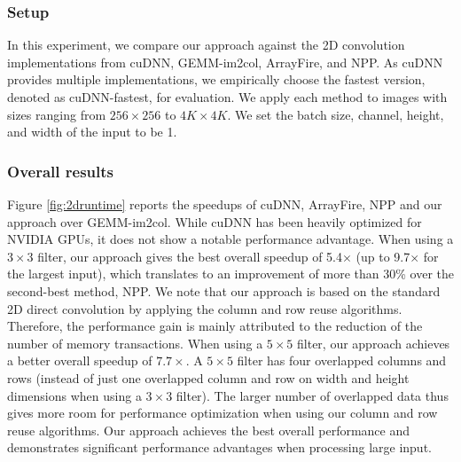 \subsubsection{Setup}
In this experiment, we compare our approach against the 2D convolution implementations from cuDNN, GEMM-im2col, ArrayFire, and
NPP. As cuDNN provides multiple implementations, we empirically choose the fastest version, denoted as cuDNN-fastest, for evaluation. We
apply each method to images with sizes ranging from $256 \times 256$ to $4K \times 4K$. We set the batch size, channel, height, and width
of the input to be 1.


\subsubsection{Overall results}
 Figure
\ref{fig:2druntime} reports the speedups of cuDNN, ArrayFire, NPP and our approach over GEMM-im2col. While cuDNN has been heavily optimized
for NVIDIA GPUs, it does not show a notable performance advantage. When using a $3 \times 3$ filter, our approach gives the best overall
speedup of 5.4$\times$ (up to 9.7$\times$ for the largest input), which translates to an improvement of  more than 30\% over the second-best method, NPP.
We note that our approach is based on the standard 2D direct convolution by applying the column and row reuse algorithms. Therefore, the
performance gain is mainly attributed to the reduction of the number of memory transactions. When using a $5 \times 5$ filter, our approach
achieves a better overall speedup of $7.7\times$. A $5 \times 5$ filter has four overlapped columns and rows (instead of just one
overlapped column and row on width and height dimensions when using a $3 \times 3$ filter). The larger number of overlapped data thus gives
more room for performance optimization when using our column and row reuse algorithms. Our approach achieves the best overall performance
and demonstrates significant performance advantages when processing large input.

